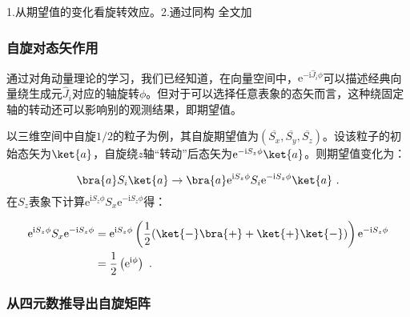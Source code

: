 
\begin{issues}
\issueDraft
1.从期望值的变化看旋转效应。2.通过同构
全文加\hat
\end{issues}

\subsubsection{自旋对态矢作用}
 通过对角动量理论的学习，我们已经知道，在向量空间中，$\mathrm e^{-\mathrm i\hat J_i\phi}$可以描述经典向量绕生成元$\hat J_i$对应的轴旋转$\phi$。但对于可以选择任意表象的态矢而言，这种绕固定轴的转动还可以影响别的观测结果，即期望值。

以三维空间中自旋$1/2$的粒子为例，其自旋期望值为$(\overline{S_x},\overline{S_y},\overline{S_z})$。设该粒子的初始态矢为$\ket{a}$，自旋绕$z$轴“转动”后态矢为$\mathrm e^{-\mathrm i S_z\phi}\ket{a}$。则期望值变化为：

\begin{equation}
\bra{a}S_i\ket{a}\rightarrow \bra{a}\mathrm e^{\mathrm i S_z\phi}S_i\mathrm e^{-\mathrm i S_z\phi}\ket{a}~.
\end{equation}
在$S_z$表象下计算$\mathrm e^{\mathrm i S_z\phi}S_x\mathrm e^{-\mathrm i S_z\phi}$得：

\begin{equation}
\begin{aligned}
\mathrm e^{\mathrm i S_z\phi}S_x\mathrm e^{-\mathrm i S_z\phi}&=\mathrm e^{\mathrm i S_z\phi}\left(\frac{1}{2}(\ket{-}\bra{+}+\ket{+}\ket{-})\right)\mathrm e^{-\mathrm i S_z\phi}\\
 &=\frac{1}{2}\left(\mathrm e^{\mathrm i \phi}\right)~.
\end{aligned}
\end{equation}
\subsubsection{从四元数推导出自旋矩阵}
